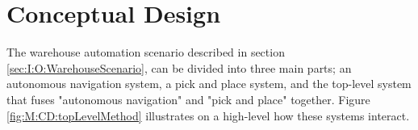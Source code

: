 







\section{Conceptual Design}\label{sec:M:ConceptualDesign}
The warehouse automation scenario described in section \ref{sec:I:O:WarehouseScenario}, can be divided into three main parts; an autonomous navigation system, a pick and place system, and the top-level system that fuses "autonomous navigation" and "pick and place" together. Figure \ref{fig:M:CD:topLevelMethod} illustrates on a high-level how these systems interact.

